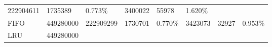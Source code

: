 \documentclass[11pt]{article}
\begin{document}
\begin{longtable}[]{@{}llllllll@{}}
\begin{minipage}[t]{0.08\columnwidth}
222904611\strut
\end{minipage} & \begin{minipage}[t]{0.09\columnwidth}\raggedright\strut
1735389\strut
\end{minipage} & \begin{minipage}[t]{0.09\columnwidth}\raggedright\strut
0.773\%\strut
\end{minipage} & \begin{minipage}[t]{0.09\columnwidth}\raggedright\strut
3400022\strut
\end{minipage} & \begin{minipage}[t]{0.10\columnwidth}\raggedright\strut
55978\strut
\end{minipage} & \begin{minipage}[t]{0.10\columnwidth}\raggedright\strut
1.620\%\strut
\end{minipage}\tabularnewline
\begin{minipage}[t]{0.14\columnwidth}\raggedright\strut
FIFO\strut
\end{minipage} & \begin{minipage}[t]{0.10\columnwidth}\raggedright\strut
449280000\strut
\end{minipage} & \begin{minipage}[t]{0.08\columnwidth}\raggedright\strut
222909299\strut
\end{minipage} & \begin{minipage}[t]{0.09\columnwidth}\raggedright\strut
1730701\strut
\end{minipage} & \begin{minipage}[t]{0.09\columnwidth}\raggedright\strut
0.770\%\strut
\end{minipage} & \begin{minipage}[t]{0.09\columnwidth}\raggedright\strut
3423073\strut
\end{minipage} & \begin{minipage}[t]{0.10\columnwidth}\raggedright\strut
32927\strut
\end{minipage} & \begin{minipage}[t]{0.10\columnwidth}\raggedright\strut
0.953\%\strut
\end{minipage}\tabularnewline
\begin{minipage}[t]{0.14\columnwidth}\raggedright\strut
LRU\strut
\end{minipage} & \begin{minipage}[t]{0.10\columnwidth}\raggedright\strut
449280000\strut
\end{minipage} & \begin{minipage}[t]{0.08\columnwidth}\raggedright\strut

\end{minipage}
\end{longtable}
\end{document}
